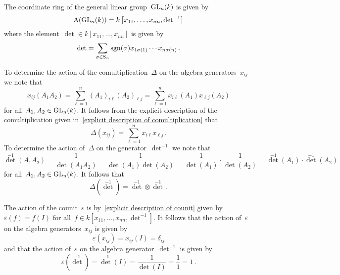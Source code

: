 \begin{example}
  The coordinate ring of the general linear group~$\operatorname{GL}_n(k)$ is given by
  \[
      \operatorname{A}(\operatorname{GL}_n(k))
    = k\left[ x_{11}, \dotsc, x_{nn}, \operatorname{det}^{-1} \right]
  \]
  where the element~$\det \in k[x_{11}, \dotsc, x_{nn}]$ is given by
  \[
      \operatorname{det}
    = \sum_{\sigma \in \operatorname{S}_n} \operatorname{sgn}(\sigma) x_{1\sigma(1)} \dotsm x_{n\sigma(n)} \,.
  \]
  
  To determine the action of the comultiplication~$\Delta$ on the algebra generators~$x_{ij}$ we note that
  \[
      x_{ij}(A_1 A_2)
    = \sum_{\ell=1}^n (A_1)_{i \ell} (A_2)_{\ell j}
    = \sum_{\ell=1}^n x_{i \ell}(A_1) x_{\ell j}(A_2)
  \]
  for all~$A_1, A_2 \in \operatorname{GL}_n(k)$.
  It follows from the explicit description of the comultiplication given in~\eqref{explicit description of comultiplication} that
  \[
      \Delta(x_{ij})
    = \sum_{\ell = 1}^n x_{i \ell} x_{\ell j} \,.
  \]
  To determine the action of~$\Delta$ on the generator~$\det^{-1}$ we note that
  \[
      \det^{-1}(A_1 A_2)
    = \frac{1}{\det(A_1 A_2)}
    = \frac{1}{\det(A_1) \det(A_2)}
    = \frac{1}{\det(A_1)} \cdot \frac{1}{\det(A_2)}
    = \det^{-1}(A_1) \cdot \det^{-1}(A_2)
  \]
  for all~$A_1, A_2 \in \operatorname{GL}_n(k)$.
  It follows that
  \[
      \Delta( \det^{-1} )
    = \det^{-1} \otimes \det^{-1} \,.
  \]
  
  The action of the counit~$\varepsilon$ is by~\eqref{explicit description of counit} given by~$\varepsilon(f) = f(I)$ for all~$f \in k[x_{11}, \dotsc, x_{nn}, \det^{-1}]$.
  It follows that the action of~$\varepsilon$ on the algebra generators~$x_{ij}$ is given by
  \[
      \varepsilon(x_{ij})
    = x_{ij}(I)
    = \delta_{ij}
  \]
  and that the action of~$\varepsilon$ on the algebra generator~$\det^{-1}$ is given by
  \[
      \varepsilon\left( \det^{-1} \right)
    = \det^{-1}(I)
    = \frac{1}{\det(I)}
    = \frac{1}{1}
    = 1 \,.
  \]
  

\end{example}

